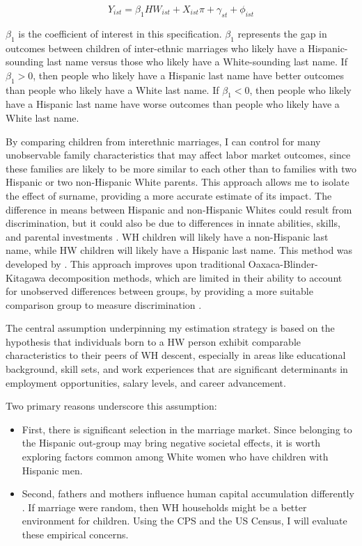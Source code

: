\begin{equation} \label{eq:1a}
Y_{ist} = \beta_{1} HW_{ist} + X_{ist} \pi + \gamma_{st} + \phi_{ist}
\end{equation}

$\beta_{1}$ is the coefficient of interest in this specification. $\beta_{1}$ represents the gap in outcomes between children of inter-ethnic marriages who likely have a Hispanic-sounding last name versus those who likely have a White-sounding last name. If $\beta_{1} > 0$, then people who likely have a Hispanic last name have better outcomes than people who likely have a White last name. If $\beta_{1} < 0$, then people who likely have a Hispanic last name have worse outcomes than people who likely have a White last name.

By comparing children from interethnic marriages, I can control for many unobservable family characteristics that may affect labor market outcomes, since these families are likely to be more similar to each other than to families with two Hispanic or two non-Hispanic White parents. This approach allows me to isolate the effect of surname, providing a more accurate estimate of its impact. The difference in means between Hispanic and non-Hispanic Whites could result from discrimination, but it could also be due to differences in innate abilities, skills, and parental investments . WH children will likely have a non-Hispanic last name, while HW children will likely have a Hispanic last name. This method was developed by \textcite{rubinstein2014pride}. This approach improves upon traditional Oaxaca-Blinder-Kitagawa decomposition methods, which are limited in their ability to account for unobserved differences between groups, by providing a more suitable comparison group to measure discrimination \autocite{oaxaca1973male,blinder1973wage,kitagawa1955components}.

The central assumption underpinning my estimation strategy is based on the hypothesis that individuals born to a HW person exhibit comparable characteristics to their peers of WH descent, especially in areas like educational background, skill sets, and work experiences that are significant determinants in employment opportunities, salary levels, and career advancement.

Two primary reasons underscore this assumption: 
\begin{itemize}
    \item First, there is significant selection in the marriage market. Since belonging to the Hispanic out-group may bring negative societal effects, it is worth exploring factors common among White women who have children with Hispanic men. 
    \item Second, fathers and mothers influence human capital accumulation differently \autocite{kimball2009risk,magruder2010intergenerational}. If marriage were random, then WH households might be a better environment for children. Using the CPS and the US Census, I will evaluate these empirical concerns.
\end{itemize}

